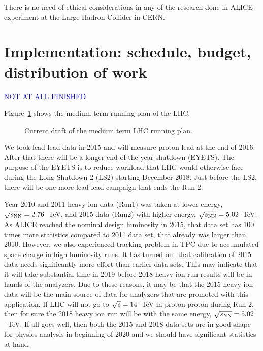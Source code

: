 There is no need of ethical considerations in any of the research done in ALICE experiment at the Large Hadron Collider in CERN.


\section{Implementation: schedule, budget, distribution of work} %
\label{sec:implementation}

\textcolor{blue}{NOT AT ALL FINISHED.}

Figure~\ref{fig:LHC-mid-term} shows the medium term running plan of the LHC. 
\begin{figure}[htbp]
   \centering
   \caption{Current draft of the medium term LHC running plan.}
   \label{fig:LHC-mid-term}
\end{figure}
We took lead-lead data in 2015 and will measure proton-lead at the end of 2016. After that there will be a longer end-of-the-year shutdown (EYETS). The purpose of the EYETS is to reduce workload that LHC would otherwise face during the Long Shutdown 2 (LS2) starting December 2018. Just before the LS2, there will be one more lead-lead campaign that ends the Run 2.

Year 2010 and 2011 heavy ion data (Run1) was taken at lower energy, $\sqrt{s_{\rm NN}}=2.76$~TeV, and 2015 data (Run2) with higher energy, $\sqrt{s_{\rm NN}}=5.02$~TeV. As ALICE reached the nominal design luminosity in 2015, that data set has 100 times more statistics compared to 2011 data set, that already was larger than 2010. However, we also experienced tracking problem in TPC due to accumulated space charge in high luminosity runs. It has turned out that calibration of 2015 data needs significantly more effort than earlier data sets. This may indicate that it will take substantial time in 2019 before 2018 heavy ion run results will be in hands of the analyzers. Due to these reasons, it may be that the 2015 heavy ion data will be the main source of data for analyzers that are promoted with this application. If LHC will not go to $\sqrt{s}{}=14$~TeV in proton-proton during Run 2, then for sure the 2018 heavy ion run will be with the same energy, $\sqrt{s_{\rm NN}}=5.02$~TeV. If all goes well, then both the 2015 and 2018 data sets are in good shape for physics analysis in beginning of 2020 and we should have significant statistics at hand.


